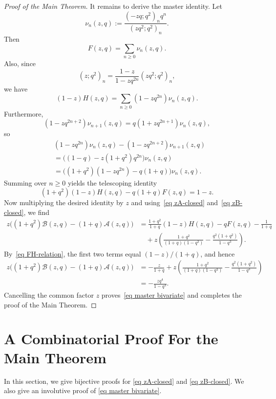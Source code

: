 \documentclass[10pt,a4paper]{amsart}
\numberwithin{equation}{section}
\begin{document}
\begin{proof}[Proof of the Main Theorem]
It remains to derive the master identity. Let
\[
\nu_n(z,q):=\frac{(-zq;q^2)_n q^n}{(zq^2;q^2)_n}.
\]
Then
\[
F(z,q)=\sum_{n\ge 0}\nu_n(z,q).
\]
Also, since
\[
(z;q^2)_n=\frac{1-z}{1-zq^{2n}}(zq^2;q^2)_n,
\]
we have
\[
(1-z)H(z,q)=\sum_{n\ge 0}(1-zq^{2n})\nu_n(z,q).
\]
Furthermore,
\[
(1-zq^{2n+2})\nu_{n+1}(z,q)=q(1+zq^{2n+1})\nu_n(z,q),
\]
so
\begin{align*}
&(1-zq^{2n})\nu_n(z,q)-(1-zq^{2n+2})\nu_{n+1}(z,q)\\
&=\big((1-q)-z(1+q^2)q^{2n}\big)\nu_n(z,q)\\
&=\big((1+q^2)(1-zq^{2n})-q(1+q)\big)\nu_n(z,q).
\end{align*}
Summing over $n\ge 0$ yields the telescoping identity
\begin{equation}\label{eq FH-relation}
(1+q^2)(1-z)H(z,q)-q(1+q)F(z,q)=1-z.
\end{equation}
Now multiplying the desired identity by $z$ and using~\eqref{eq zA-closed} and~\eqref{eq zB-closed}, we find
\begin{align*}
z\big((1+q^2)\mathcal B(z,q)-(1+q)\mathcal A(z,q)\big)
&=\frac{1+q^2}{1+q}(1-z)H(z,q)-qF(z,q)-\frac{1}{1+q} \\
&\quad +z\left(\frac{1+q^2}{(1+q)(1-q^3)}-\frac{q^2(1+q^2)}{1-q^3}\right).
\end{align*}
By~\eqref{eq FH-relation}, the first two terms equal $(1-z)/(1+q)$, and hence
\begin{align*}
z\big((1+q^2)\mathcal B(z,q)-(1+q)\mathcal A(z,q)\big)
&=-\frac{z}{1+q}+z\left(\frac{1+q^2}{(1+q)(1-q^3)}-\frac{q^2(1+q^2)}{1-q^3}\right)\\
&=-\frac{zq^4}{1-q^3}.
\end{align*}
Cancelling the common factor $z$ proves~\eqref{eq master bivariate} and completes the proof of the Main Theorem.
\end{proof}

\section{A Combinatorial Proof For the Main Theorem}\label{combinatorialproofs}

In this section, we give bijective proofs for \eqref{eq zA-closed} and \eqref{eq zB-closed}. We also give an involutive proof of \eqref{eq master bivariate}. 
\end{document}
